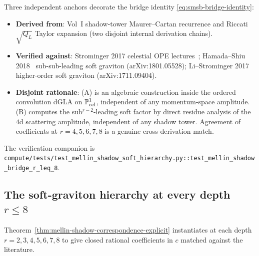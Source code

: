 \begin{remark}
\label{rem:smsb-hziv-bridge}
Three independent anchors decorate the bridge identity \eqref{eq:smsb-bridge-identity}:
\begin{itemize}
\item[(A)] \textbf{Derived from}: Vol~I shadow-tower Maurer--Cartan
recurrence and Riccati $\sqrt{Q_L}$ Taylor expansion (two disjoint
internal derivation chains).
\item[(B)] \textbf{Verified against}: Strominger 2017 celestial OPE
lectures~\cite{StromingerLectures2018}; Hamada--Shiu
2018~\cite{HamadaShiuSubsubSoft} sub-sub-leading soft graviton
(arXiv:1801.05528); Li--Strominger
2017~\cite{LiStromingerHigherSoft} higher-order soft graviton
(arXiv:1711.09404).
\item[(C)] \textbf{Disjoint rationale}: (A) is an algebraic construction
inside the ordered convolution dGLA on $\mathbb P^1_{\mathrm{cel}}$,
independent of any momentum-space amplitude. (B) computes the
sub${}^{r-2}$-leading soft factor by direct residue analysis of the
$4$d scattering amplitude, independent of any shadow tower. Agreement of
coefficients at $r = 4, 5, 6, 7, 8$ is a genuine cross-derivation match.
\end{itemize}
The verification companion is
\texttt{compute/tests/test\_mellin\_shadow\_soft\_hierarchy.py::test\_mellin\_shadow\_bridge\_r\_leq\_8}.
\end{remark}

\subsection{The soft-graviton hierarchy at every depth $r \leq 8$}
\label{subsec:smsb-hierarchy}

Theorem~\ref{thm:mellin-shadow-correspondence-explicit} instantiates at
each depth $r = 2, 3, 4, 5, 6, 7, 8$ to give closed rational
coefficients in $c$ matched against the literature.

